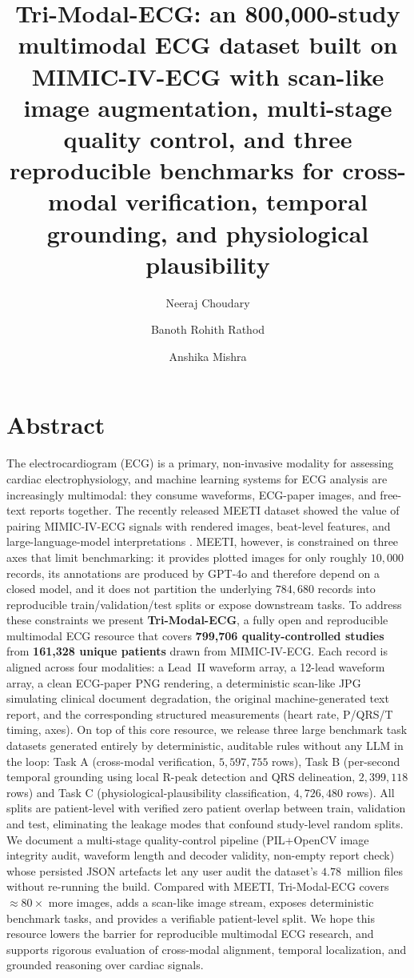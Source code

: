 \documentclass[12pt,letterpaper]{article}
\title{Tri-Modal-ECG: an 800{,}000-study multimodal ECG dataset built on MIMIC-IV-ECG with scan-like image augmentation, multi-stage quality control, and three reproducible benchmarks for cross-modal verification, temporal grounding, and physiological plausibility}
\date{}
\author[1]{Neeraj Choudary}
\author[1]{Banoth Rohith Rathod}
\author[1]{Anshika Mishra}
\affil[1]{Mahindra University, Hyderabad, India}
\makeatletter
\renewcommand{\maketitle}{\bgroup\setlength{\parindent}{0pt}
\begin{flushleft}
 \textbf{\@title}

 \@author
\end{flushleft}\egroup}
\makeatother
\begin{document}
\maketitle

\section*{Abstract}

The electrocardiogram (ECG) is a primary, non-invasive modality for assessing cardiac electrophysiology, and machine learning systems for ECG analysis are increasingly multimodal: they consume waveforms, ECG-paper images, and free-text reports together. The recently released MEETI dataset showed the value of pairing MIMIC-IV-ECG signals with rendered images, beat-level features, and large-language-model interpretations \cite{zhang2024meeti}. MEETI, however, is constrained on three axes that limit benchmarking: it provides plotted images for only roughly $10{,}000$ records, its annotations are produced by GPT-4o and therefore depend on a closed model, and it does not partition the underlying $784{,}680$ records into reproducible train/validation/test splits or expose downstream tasks. To address these constraints we present \textbf{Tri-Modal-ECG}, a fully open and reproducible multimodal ECG resource that covers \textbf{799{,}706 quality-controlled studies} from \textbf{161{,}328 unique patients} drawn from MIMIC-IV-ECG. Each record is aligned across four modalities: a Lead~II waveform array, a 12-lead waveform array, a clean ECG-paper PNG rendering, a deterministic scan-like JPG simulating clinical document degradation, the original machine-generated text report, and the corresponding structured measurements (heart rate, P/QRS/T timing, axes). On top of this core resource, we release three large benchmark task datasets generated entirely by deterministic, auditable rules without any LLM in the loop: Task A (cross-modal verification, $5{,}597{,}755$ rows), Task B (per-second temporal grounding using local R-peak detection and QRS delineation, $2{,}399{,}118$ rows) and Task C (physiological-plausibility classification, $4{,}726{,}480$ rows). All splits are patient-level with verified zero patient overlap between train, validation and test, eliminating the leakage modes that confound study-level random splits. We document a multi-stage quality-control pipeline (PIL+OpenCV image integrity audit, waveform length and decoder validity, non-empty report check) whose persisted JSON artefacts let any user audit the dataset's $4.78$~million files without re-running the build. Compared with MEETI, Tri-Modal-ECG covers $\approx80\times$ more images, adds a scan-like image stream, exposes deterministic benchmark tasks, and provides a verifiable patient-level split. We hope this resource lowers the barrier for reproducible multimodal ECG research, and supports rigorous evaluation of cross-modal alignment, temporal localization, and grounded reasoning over cardiac signals.
\end{document}
